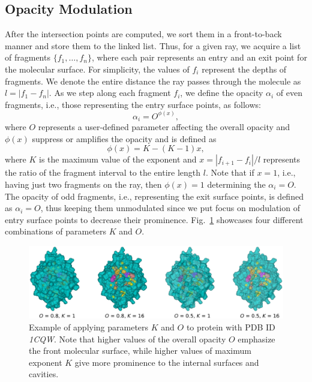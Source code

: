 \subsection{Opacity Modulation}\label{sec:opacity}
After the intersection points are computed, we sort them in a front-to-back manner and store them to the linked list. 
Thus, for a given ray, we acquire a list of fragments $\{f_1,\ldots,f_n \}$, where each pair represents an entry and an exit point for the molecular surface. For simplicity, the values of $f_i$ represent the depths of fragments. 
We denote the entire distance the ray passes through the molecule as $l=|f_1-f_n|$. 
As we step along each fragment $f_i$, we define the opacity $\alpha_i$ of even fragments, i.e., those representing the entry surface points, as follows:
\begin{equation}
  \alpha_i = O^{\phi(x)},
	\label{eq:alphaDistEven}
\end{equation}	
where $O$ represents a user-defined parameter affecting the overall opacity and $\phi(x)$ suppress or amplifies the opacity and is defined as
\begin{equation}
  \phi(x) = K-(K-1)x,
	\label{eq:exponent}
\end{equation}	
where $K$ is the maximum value of the exponent and $x=|f_{i+1}-f_i|/l$ represents the ratio of the fragment interval to the entire length $l$. Note that if $x=1$, i.e., having just two fragments on the ray, then $\phi(x)=1$ determining the $\alpha_i=O$. The opacity of odd fragments, i.e., representing the exit surface points, is defined as $\alpha_i = O$, thus keeping them unmodulated
since we put focus on modulation of entry surface points to decrease their prominence.
Fig.~\ref{fig:Oparam} showcases four different combinations of parameters $K$ and $O$.
\begin{figure}[htb]
  \centering
  \includegraphics[width=\textwidth]{image/Oparam2.pdf}
  \caption{Example of applying parameters $K$ and $O$ to protein with PDB ID \textit{1CQW}. Note that higher values of the overall opacity $O$ emphasize the front molecular surface, while higher values of maximum exponent $K$ give more prominence to the internal surfaces and cavities.}
	\label{fig:Oparam}
\end{figure}

